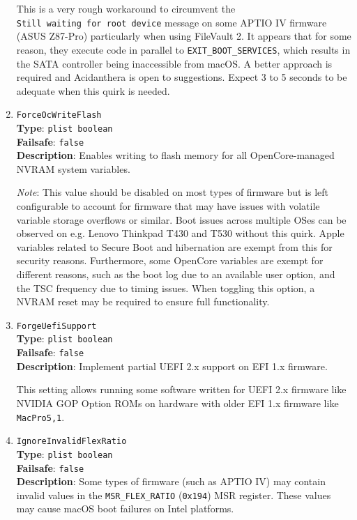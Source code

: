 \documentclass[]{article}
\begin{document}
\begin{enumerate}
  This is a very rough workaround to circumvent the \texttt{Still\ waiting\ for\ root\ device} message
  on some APTIO IV firmware (ASUS Z87-Pro) particularly when using FileVault 2.
  It appears that for some reason, they execute code in parallel to \texttt{EXIT\_BOOT\_SERVICES},
  which results in the SATA controller being inaccessible from macOS. A better approach is required
  and Acidanthera is open to suggestions. Expect 3 to 5 seconds to be adequate when this quirk is needed.

\item
  \texttt{ForceOcWriteFlash}\\
  \textbf{Type}: \texttt{plist\ boolean}\\
  \textbf{Failsafe}: \texttt{false}\\
  \textbf{Description}: Enables writing to flash memory for all OpenCore-managed NVRAM system variables.

  \emph{Note}: This value should be disabled on most types of firmware but is
  left configurable to account for firmware that may have issues with volatile
  variable storage overflows or similar. Boot issues across multiple OSes can be
  observed on e.g. Lenovo Thinkpad T430 and T530 without this quirk. Apple
  variables related to Secure Boot and hibernation are exempt from this for
  security reasons. Furthermore, some OpenCore variables are exempt for
  different reasons, such as the boot log due to an available user option, and
  the TSC frequency due to timing issues. When toggling this option, a NVRAM
  reset may be required to ensure full functionality.

\item
  \texttt{ForgeUefiSupport}\\
  \textbf{Type}: \texttt{plist\ boolean}\\
  \textbf{Failsafe}: \texttt{false}\\
  \textbf{Description}: Implement partial UEFI 2.x support on EFI 1.x firmware.

  This setting allows running some software written for UEFI 2.x firmware like NVIDIA GOP
  Option ROMs on hardware with older EFI 1.x firmware like \texttt{MacPro5,1}.

\item
  \texttt{IgnoreInvalidFlexRatio}\\
  \textbf{Type}: \texttt{plist\ boolean}\\
  \textbf{Failsafe}: \texttt{false}\\
  \textbf{Description}: Some types of firmware (such as APTIO IV) may contain invalid values in the
  \texttt{MSR\_FLEX\_RATIO} (\texttt{0x194}) MSR register. These values may cause
  macOS boot failures on Intel platforms.


\end{enumerate}
\end{document}
